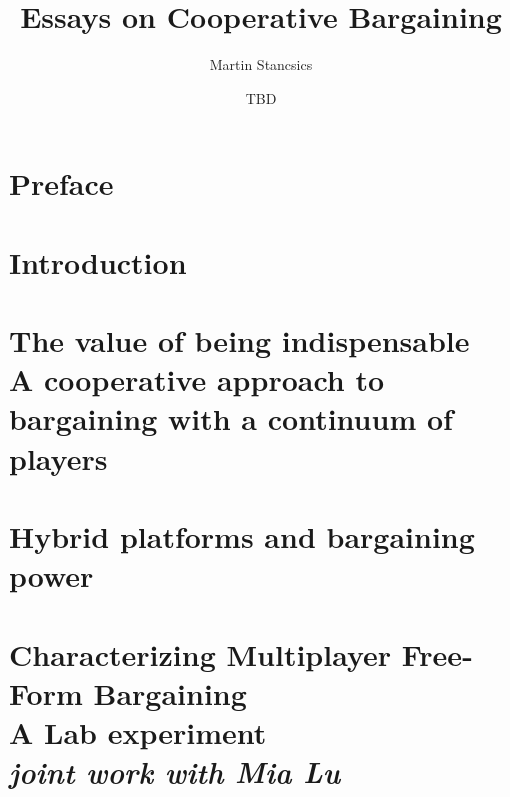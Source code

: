 \documentclass[a4paper,11pt,twoside,openright]{report}
\title{Essays on Cooperative Bargaining}
\author{Martin Stancsics}
\date{TBD}
\begin{document}




\chapter*{Preface}


\tableofcontents
{}

\chapter{Introduction}
\label{ch:introduction}
\setcounter{page}{1}



\chapter[The value of being indispensable]{%
    The value of being indispensable\\\vspace{0.4cm}%
    \large{A cooperative approach to bargaining with a continuum of players}%
}
\label{ch:theory}

\begin{subappendices}
    
\end{subappendices}

\chapter{Hybrid platforms and bargaining power}
\label{ch:application}

\begin{subappendices}
    
\end{subappendices}

\chapter[Characterizing Multiplayer Free-Form Bargaining]{%
    Characterizing Multiplayer Free-Form Bargaining\\\vspace{0.4cm}%
    \large{A Lab experiment}\\\vspace{0.2cm}%
    \large{\textit{joint work with Mia Lu}}%
}
\label{ch:experiment}

\begin{subappendices}
    
\end{subappendices}

\singlespacing

\printbibliography


\end{document}
